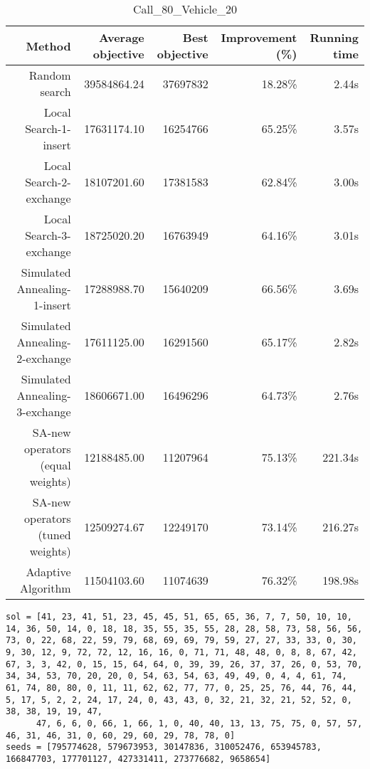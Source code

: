 \begin{table}[ht]
\centering
\caption{Call\_80\_Vehicle\_20}
\label{tab:call80vehicle20}
\begin{tabular}{|r|r|r|r|r|}
Method & Average objective & Best objective & Improvement (\%) & Running time \\
\hline
Random search & 39584864.24 & 37697832 & 18.28\% & 2.44s\\
Local Search-1-insert & 17631174.10 & 16254766 & 65.25\% & 3.57s\\
Local Search-2-exchange & 18107201.60 & 17381583 & 62.84\% & 3.00s\\
Local Search-3-exchange & 18725020.20 & 16763949 & 64.16\% & 3.01s\\
Simulated Annealing-1-insert & 17288988.70 & 15640209 & 66.56\% & 3.69s\\
Simulated Annealing-2-exchange & 17611125.00 & 16291560 & 65.17\% & 2.82s\\
Simulated Annealing-3-exchange & 18606671.00 & 16496296 & 64.73\% & 2.76s\\
SA-new operators (equal weights) & 12188485.00 & 11207964 & 75.13\% & 221.34s\\
SA-new operators (tuned weights) & 12509274.67 & 12249170 & 73.14\% & 216.27s\\
Adaptive Algorithm & 11504103.60 & 11074639 & 76.32\% & 198.98s\\
\end{tabular}%
\end{table}
\begin{lstlisting}[label={lst:call80vehicle20},caption=Optimal solution call\_80\_vehicle\_20]
sol = [41, 23, 41, 51, 23, 45, 45, 51, 65, 65, 36, 7, 7, 50, 10, 10, 14, 36, 50, 14, 0, 18, 18, 35, 55, 35, 55, 28, 28, 58, 73, 58, 56, 56, 73, 0, 22, 68, 22, 59, 79, 68, 69, 69, 79, 59, 27, 27, 33, 33, 0, 30, 9, 30, 12, 9, 72, 72, 12, 16, 16, 0, 71, 71, 48, 48, 0, 8, 8, 67, 42, 67, 3, 3, 42, 0, 15, 15, 64, 64, 0, 39, 39, 26, 37, 37, 26, 0, 53, 70, 34, 34, 53, 70, 20, 20, 0, 54, 63, 54, 63, 49, 49, 0, 4, 4, 61, 74, 61, 74, 80, 80, 0, 11, 11, 62, 62, 77, 77, 0, 25, 25, 76, 44, 76, 44, 5, 17, 5, 2, 2, 24, 17, 24, 0, 43, 43, 0, 32, 21, 32, 21, 52, 52, 0, 38, 38, 19, 19, 47,
      47, 6, 6, 0, 66, 1, 66, 1, 0, 40, 40, 13, 13, 75, 75, 0, 57, 57, 46, 31, 46, 31, 0, 60, 29, 60, 29, 78, 78, 0]
seeds = [795774628, 579673953, 30147836, 310052476, 653945783, 166847703, 177701127, 427331411, 273776682, 9658654]
\end{lstlisting}%
\clearpage


